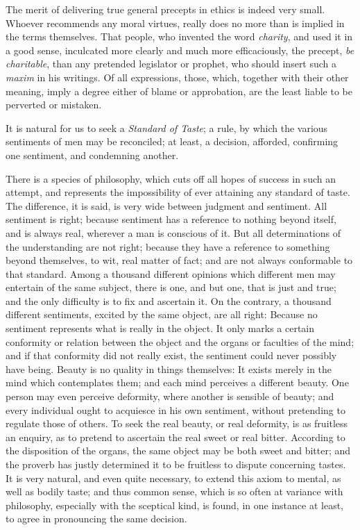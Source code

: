 The merit of delivering true general precepts in ethics is indeed very
small. Whoever recommends any moral virtues, really does no more than
is implied in the terms themselves. That people, who invented the word
\textit{charity}, and used it in a good sense, inculcated more clearly
and much more efficaciously, the precept, \textit{be charitable}, than
any pretended legislator or prophet, who should insert such a
\textit{maxim} in his writings. Of all expressions, those, which,
together with their other meaning, imply a degree either of blame or
approbation, are the least liable to be perverted or mistaken.

It is natural for us to seek a \textit{Standard of Taste}; a rule, by
which the various sentiments of men may be reconciled; at least, a
decision, afforded, confirming one sentiment, and condemning another.

There is a species of philosophy, which cuts off all hopes of success
in such an attempt, and represents the impossibility of ever attaining
any standard of taste. The difference, it is said, is very wide
between judgment and sentiment. All sentiment is right; because
sentiment has a reference to nothing beyond itself, and is always
real, wherever a man is conscious of it. But all determinations of the
understanding are not right; because they have a reference to
something beyond themselves, to wit, real matter of fact; and are not
always conformable to that standard. Among a thousand different
opinions which different men may entertain of the same subject, there
is one, and but one, that is just and true; and the only difficulty is
to fix and ascertain it. On the contrary, a thousand different
sentiments, excited by the same object, are all right: Because no
sentiment represents what is really in the object. It only marks a
certain conformity or relation between the object and the organs or
faculties of the mind; and if that conformity did not really exist,
the sentiment could never possibly have being. Beauty is no quality in
things themselves: It exists merely in the mind which contemplates
them; and each mind perceives a different beauty. One person may even
perceive deformity,  where another is sensible of beauty;
and every individual ought to acquiesce in his own sentiment, without
pretending to regulate those of others. To seek the real beauty, or
real deformity, is as fruitless an enquiry, as to pretend to ascertain
the real sweet or real bitter. According to the disposition of the
organs, the same object may be both sweet and bitter; and the proverb
has justly determined it to be fruitless to dispute concerning tastes.
It is very natural, and even quite necessary, to extend this axiom to
mental, as well as bodily taste; and thus common sense, which is so
often at variance with philosophy, especially with the sceptical kind,
is found, in one instance at least, to agree in pronouncing the same
decision.

